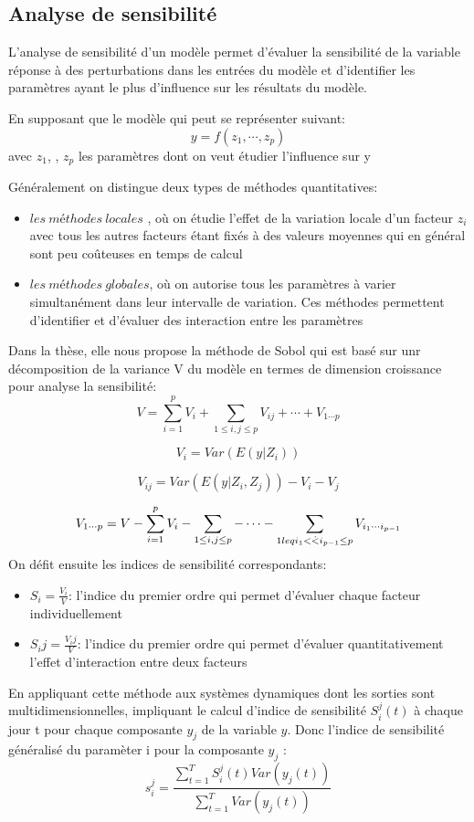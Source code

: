 \subsection{Analyse de sensibilité}
L'analyse de sensibilité d'un modèle permet d'évaluer la sensibilité de      la variable réponse à des perturbations dans les entrées du modèle et d'identifier les paramètres ayant le plus d'influence sur les résultats du modèle.

En supposant que le modèle qui peut se représenter suivant:
\[ {y}=f(z_1, \cdots,z_p)\]
avec $z_1$, \cdots , $z_p$ les paramètres dont on veut étudier l'influence sur y

Généralement on distingue deux types de méthodes quantitatives:
\begin{itemize}
\item $les\ méthodes\ locales$ , où on étudie l'effet de la variation locale d'un facteur $z_i$ avec tous les autres facteurs étant fixés à des valeurs moyennes qui en général sont peu coûteuses en temps de calcul
\item $les\ méthodes\ globales$, où on autorise tous les paramètres à varier simultanément dans leur intervalle de variation. Ces méthodes permettent d'identifier et d'évaluer des interaction entre les paramètres
\end{itemize}                                                
Dans la thèse, elle nous propose la méthode de Sobol qui est basé sur unr décomposition de la variance V du modèle en termes de dimension croissance pour analyse la sensibilité:
\[ {V}=\sum_{i=1}^pV_i+\sum_{1\leq i,j \leq p} V_{ij}+\cdots +V_{1\cdots p}\]

\[ {V_i}=Var(E(y|Z_i))\]

\[ {V_{ij}}=Var(E(y|Z_i,Z_j))-V_i-V_j \]

\[ {V_{1\cdots p}}=V-\sum_{i=1}^p V_i-\sum_{1\leq i,j \leq p}-\cdots -\sum_{1\\leq i_1<\dot <i_{p-1}\leq p} V_{i_1 \cdots i_{p-1}} \]
On défit ensuite les indices de sensibilité correspondants:
\begin{itemize}
\item $S_i=\frac{V_i}{V}$: l'indice du premier ordre qui permet d'évaluer chaque facteur individuellement
\item $S_ij=\frac{V_ij}{V}$: l'indice du premier ordre qui permet d'évaluer quantitativement l'effet d'interaction entre deux facteurs
\end{itemize}
En appliquant cette méthode aux systèmes dynamiques dont les sorties sont multidimensionnelles, impliquant le calcul d'indice de sensibilité $S_i^j(t)$ à chaque jour t pour chaque composante $y_j$ de la variable $y$.
Donc l'indice de sensibilité généralisé du paramèter i  pour la composante $y_j$ :
\[ {s_i^j}=\frac{\sum_{t=1}^TS_i^j(t)Var(y_j(t))}{\sum_{t=1}^T Var(y_j(t))} \]